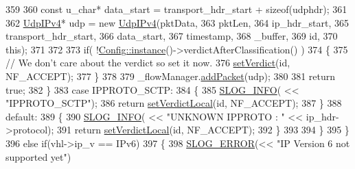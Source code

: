 \begin{DoxyCode}
359 
360                 \textcolor{keyword}{const} u\_char* data\_start = transport\_hdr\_start + \textcolor{keyword}{sizeof}(udphdr);
361 
362                 \hyperlink{class_vsid_common_1_1_udp_i_pv4}{UdpIPv4}* udp = \textcolor{keyword}{new} \hyperlink{class_vsid_common_1_1_udp_i_pv4}{UdpIPv4}(pktData, 
363                                         pktLen, 
364                                         ip\_hdr\_start, 
365                                         transport\_hdr\_start, 
366                                         data\_start, 
367                                         timestamp, 
368                                         \_buffer,
369                                         \textcolor{keywordtype}{id},
370                                         \textcolor{keyword}{this});
371 
372 
373                 \textcolor{keywordflow}{if}( !\hyperlink{class_vsid_netfilter_1_1_config_abf1d4539011ef83cac0fef2ac864a3a9}{Config::instance}()->verdictAfterClassification() )
374                 \{
375                     \textcolor{comment}{// We don't care about the verdict so set it now.}
376                     \hyperlink{class_vsid_netfilter_1_1_packet_handler_abb5ca3f313ceaed495dd06ce56bdf849}{setVerdict}(\textcolor{keywordtype}{id}, NF\_ACCEPT);
377                 \}
378 
379                 \_flowManager.\hyperlink{class_vsid_common_1_1_flow_manager_a9c840fe2a6650079a3b90ba2d65f1e7e}{addPacket}(udp);
380 
381                 \textcolor{keywordflow}{return} \textcolor{keyword}{true};
382             \}
383             \textcolor{keywordflow}{case} IPPROTO\_SCTP:
384             \{
385                 \hyperlink{_logger_8h_a119c1c29ba35a8db38e2358e41167282}{SLOG\_INFO}( << \textcolor{stringliteral}{"IPPROTO\_SCTP"});
386                 \textcolor{keywordflow}{return} \hyperlink{class_vsid_netfilter_1_1_packet_handler_a579cb580e2801acc62e56336b59242c4}{setVerdictLocal}(\textcolor{keywordtype}{id}, NF\_ACCEPT);
387             \}
388             \textcolor{keywordflow}{default}:
389             \{
390                 \hyperlink{_logger_8h_a119c1c29ba35a8db38e2358e41167282}{SLOG\_INFO}( << \textcolor{stringliteral}{"UNKNOWN IPPROTO : "} << ip\_hdr->protocol);
391                 \textcolor{keywordflow}{return} \hyperlink{class_vsid_netfilter_1_1_packet_handler_a579cb580e2801acc62e56336b59242c4}{setVerdictLocal}(\textcolor{keywordtype}{id}, NF\_ACCEPT);
392             \}
393 
394         \}
395     \}
396     \textcolor{keywordflow}{else} \textcolor{keywordflow}{if}(vhl->ip\_v == IPv6)
397     \{
398         \hyperlink{_logger_8h_a2a8694cd392d18f4db6b9cc9f15bafe3}{SLOG\_ERROR}(<< \textcolor{stringliteral}{"IP Version 6 not supported yet"})

\end{DoxyCode}

